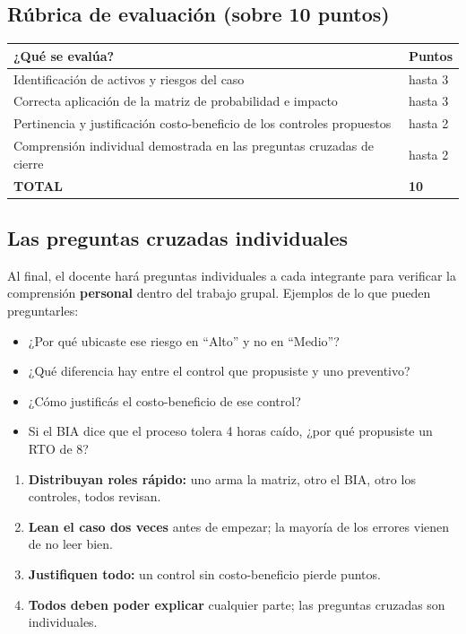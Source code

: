 \documentclass[12pt,a4paper]{article}
\renewcommand{\arraystretch}{1.25}
\begin{document}
\subsection{R\'ubrica de evaluaci\'on (sobre 10 puntos)}

\renewcommand{\arraystretch}{1.5}
\begin{tabularx}{\textwidth}{|X|>{\centering\arraybackslash}p{3cm}|}
\hline
\rowcolor{violetaParcial!20}
\textbf{¿Qu\'e se eval\'ua?} & \textbf{Puntos} \\
\hline
Identificaci\'on de activos y riesgos del caso & hasta 3 \\
\hline
Correcta aplicaci\'on de la matriz de probabilidad e impacto & hasta 3 \\
\hline
Pertinencia y justificaci\'on costo-beneficio de los controles propuestos & hasta 2 \\
\hline
Comprensi\'on individual demostrada en las preguntas cruzadas de cierre & hasta 2 \\
\hline
\rowcolor{grisClaro}
\textbf{TOTAL} & \textbf{10} \\
\hline
\end{tabularx}

\subsection{Las preguntas cruzadas individuales}
Al final, el docente har\'a preguntas individuales a cada integrante para verificar la comprensi\'on \textbf{personal} dentro del trabajo grupal. Ejemplos de lo que pueden preguntarles:
\begin{itemize}[leftmargin=2em]
    \item ¿Por qu\'e ubicaste ese riesgo en ``Alto'' y no en ``Medio''?
    \item ¿Qu\'e diferencia hay entre el control que propusiste y uno preventivo?
    \item ¿C\'omo justific\'as el costo-beneficio de ese control?
    \item Si el BIA dice que el proceso tolera 4 horas ca\'ido, ¿por qu\'e propusiste un RTO de 8?
\end{itemize}

\begin{cajaNota}[title={Consejos para el d\'ia del Parcial}]
\begin{enumerate}[leftmargin=2em]
    \item \textbf{Distribuyan roles r\'apido:} uno arma la matriz, otro el BIA, otro los controles, todos revisan.
    \item \textbf{Lean el caso dos veces} antes de empezar; la mayor\'ia de los errores vienen de no leer bien.
    \item \textbf{Justifiquen todo:} un control sin costo-beneficio pierde puntos.
    \item \textbf{Todos deben poder explicar} cualquier parte; las preguntas cruzadas son individuales.
\end{enumerate}
\end{cajaNota}
\end{document}
